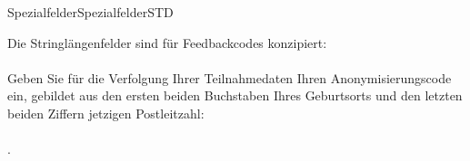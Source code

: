 \begin{MXContent}{Spezialfelder}{Spezialfelder}{STD}
\begin{MExample}
Die Stringlängenfelder sind für Feedbackcodes konzipiert:
\ \\ \ \\
Geben Sie für die Verfolgung Ihrer Teilnahmedaten Ihren Anonymisierungscode ein, gebildet aus den ersten beiden Buchstaben Ihres Geburtsorts
und den letzten beiden Ziffern jetzigen Postleitzahl:
\ \\ \ \\
.
\end{MExample}

\end{MXContent}

